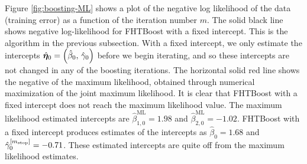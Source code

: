 Figure \ref{fig:boosting-ML} shows a plot of the negative log likelihood of the data (training error) as a function of the iteration number $m$.
The solid black line shows negative log-likelihood for FHTBoost with a fixed intercept.
This is the algorithm in the previous subsection.
With a fixed intercept, we only estimate the intercepts $\hat{\boldsymbol{\eta}}_0=\left(\hat{\beta}_{0},\,\hat{\gamma}_{0}\right)$ before we begin iterating, and so these intercepts are not changed in any of the boosting iterations.
The horizontal solid red line shows the negative of the maximum likelihood, obtained through numerical maximization of the joint maximum likelihood.
It is clear that FHTBoost with a fixed intercept does not reach the maximum likelihood value.
The maximum likelihood estimated intercepts are $\hat{\beta}^{\text{ML}}_{1,0}=1.98$ and $\hat{\beta}^{\text{ML}}_{2,0}=-1.02$.
FHTBoost with a fixed intercept produces estimates of the intercepts as $\hat{\beta}_{0}=1.68$ and $\hat{\gamma}^{[m_{\text{stop}}]}_{0}=-0.71$.
These estimated intercepts are quite off from the maximum likelihood estimates.

